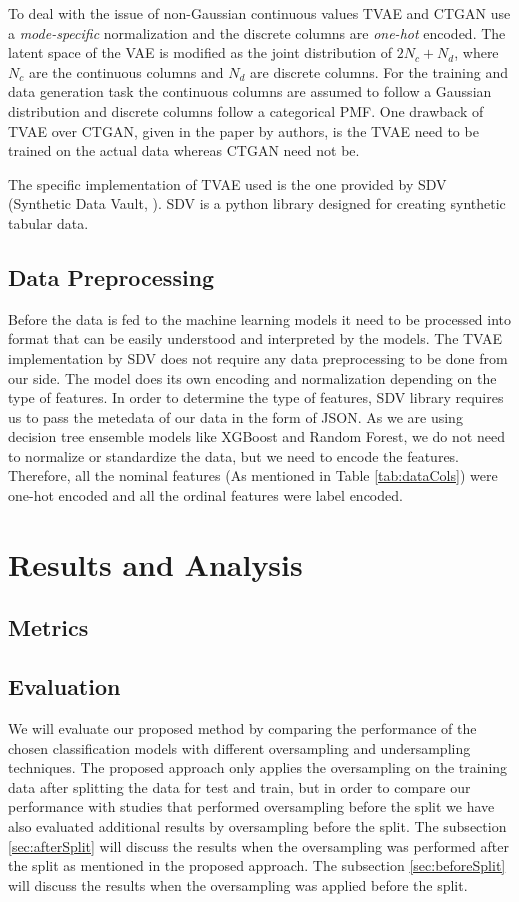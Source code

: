 \documentclass[twoside,11pt]{article}
\begin{document}
To deal with the issue of non-Gaussian continuous values TVAE and CTGAN use a \emph{mode-specific} normalization and the discrete columns are \emph{one-hot} encoded. The latent space of the VAE is modified as the joint distribution of \(2N_c + N_d\), where \(N_c\) are the continuous columns and \(N_d\) are discrete columns. For the training and data generation task the continuous columns are assumed to follow a Gaussian distribution and discrete columns follow a categorical PMF. One drawback of TVAE over CTGAN, given in the paper by authors, is the TVAE need to be trained on the actual data whereas CTGAN need not be. 

The specific implementation of TVAE used is the one provided by SDV (Synthetic Data Vault, \citealp{SDV}). SDV is a python library designed for creating synthetic tabular data.

\subsection{Data Preprocessing}
Before the data is fed to the machine learning models it need to be processed into format that can be easily understood and interpreted by the models. The TVAE implementation by SDV does not require any data preprocessing to be done from our side. The model does its own encoding and normalization depending on the type of features. In order to determine the type of features, SDV library requires us to pass the metedata of our data in the form of JSON. As we are using decision tree ensemble models like XGBoost and Random Forest, we do not need to normalize or standardize the data, but we need to encode the features. Therefore, all the nominal features (As mentioned in Table \ref{tab:dataCols}) were one-hot encoded and all the ordinal features were label encoded.

\section{Results and Analysis}  \label{sec:result}
\subsection{Metrics}

\subsection{Evaluation}
We will evaluate our proposed method by comparing the performance of the chosen classification models with different oversampling and undersampling techniques. The proposed approach only applies the oversampling on the training data after splitting the data for test and train, but in order to compare our performance with studies that performed oversampling before the split we have also evaluated additional results by oversampling before the split. The subsection \ref{sec:afterSplit} will discuss the results when the oversampling was performed after the split as mentioned in the proposed approach. The subsection \ref{sec:beforeSplit} will discuss the results when the oversampling was applied before the split.
\end{document}
